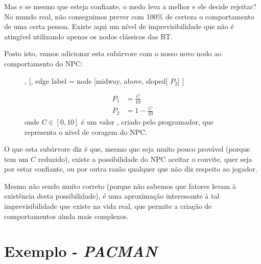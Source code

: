 {    Mas e se mesmo que esteja confiante, o medo leva a melhor e ele decide rejeitar?
    No mundo real, não conseguimos prever com 100\% de certeza o comportamento de uma certa pessoa.
    Existe aqui um nível de imprevisibilidade que não é atingível utilizando apenas os nodos clássicos das BT.

    Posto isto, vamos adicionar esta subárvore com o nosso novo nodo ao comportamento do NPC:

    \begin{figure}[H]
    \centering
        \begin{behavior}
            [\probselector
                [\action{Accept}, edge label = {node [midway, above, sloped] {$P_1$}}],
                [, edge label = {node [midway, above, sloped] {$P_2$}}]
            ]
        \end{behavior}

        \begin{align*}
            P_1 &= \frac{C}{10} \\
            P_2 &= 1 - \frac{C}{10}
        \end{align*}
        onde $C \in [0,10]$ é um valor , criado pelo programador, que representa o nível de coragem do NPC.
    \end{figure}
    
    O que esta subárvore diz é que, mesmo que seja muito pouco provável (porque tem um $C$ reduzido), existe a possibilidade do NPC aceitar o convite, quer seja por estar confiante, ou por outra razão qualquer que não diz respeito ao jogador.

    Mesmo não sendo muito correto (porque não sabemos que fatores levam à existência desta possibilidade), é uma aproximação interessante à tal imprevisibilidade que existe na vida real, que permite a criação de comportamentos ainda mais complexos.

}








\section{Exemplo - \textit{PACMAN}}


